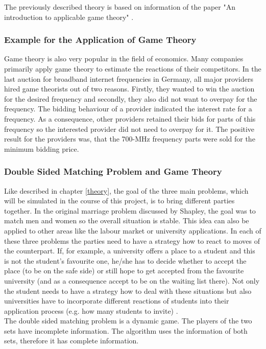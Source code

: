 The previously described theory is based on information of the paper "An introduction to applicable game theory" \cite {gibbons1997gametheory}.

\subsubsection{Example for the Application of Game Theory}
Game theory is also very popular in the field of economics.
Many companies primarily apply game theory to estimate the reactions of their competitors. 
In the last auction for broadband internet frequencies in Germany, all major providers hired game theorists out of two reasons. 
Firstly, they wanted to win the auction for the desired frequency and secondly, they also did not want to overpay for the frequency.
The bidding behaviour of a provider indicated the interest rate for a frequency. 
As a consequence, other providers retained their bids for parts of this frequency so the interested provider did not need to overpay for it. 
The positive result for the providers was, that the 700-MHz frequency parts were sold for the minimum bidding price. \cite{gametheoryWelt}

\subsubsection{Double Sided Matching Problem and Game Theory}

Like described in chapter \ref{theory}, the goal of the three main problems, which will be simulated in the course of this project, is to bring different parties together.
In the original marriage problem discussed by Shapley, the goal was to match men and women so the overall situation is stable.
This idea can also be applied to other areas like the labour market or university applications.
In each of these three problems the parties need to have a strategy how to react to moves of the counterpart.
If, for example, a university offers a place to a student and this is not the student's favourite one, he/she has to decide whether to accept the place (to be on the safe side) or still hope to get accepted from the favourite university (and as a consequence accept to be on the waiting list there).
Not only the student needs to have a strategy how to deal with these situations but also universities have to incorporate different reactions of students into their application process (e.g. how many students to invite) \cite{gale62a}. \\
The double sided matching problem is a dynamic game.
The players of the two sets have incomplete information.
The algorithm uses the information of both sets, therefore it has complete information.

